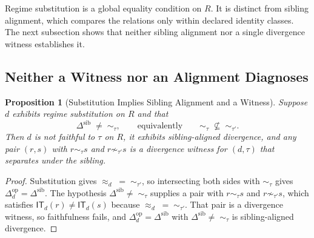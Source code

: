 \documentclass[11pt]{article}
\theoremstyle{plain}
\newtheorem{proposition}[theorem]{Proposition}
\theoremstyle{definition}
\theoremstyle{remark}
\newcommand{\IT}{\ensuremath{\mathsf{IT}}}
\newcommand{\Ker}{\ensuremath{\mathrel{\approx_{d}}}}
\newcommand{\Dop}{\ensuremath{\Delta^{\mathrm{op}}_{d}}}
\newcommand{\Dsib}{\ensuremath{\Delta^{\mathrm{sib}}}}
\begin{document}
Regime substitution is a global equality condition on \(R\).
It is distinct from sibling alignment, which compares the relations
only within declared identity classes.
The next subsection shows that neither sibling alignment
nor a single divergence witness establishes it.

\subsection{Neither a Witness nor an Alignment Diagnoses}

\begin{proposition}[Substitution Implies Sibling Alignment and a Witness]
  \label{oi.prop.substitution-witness}
  Suppose \(d\) exhibits regime substitution on \(R\)
  and that
  \[
    \Dsib
    \;\neq\;
    \sim_{\tau},
    \qquad\text{equivalently}\qquad
    \sim_{\tau}\;\not\subseteq\;\sim_{\tau'}.
  \]
  Then \(d\) is not faithful to \(\tau\) on \(R\),
  it exhibits sibling-aligned divergence,
  and any pair \((r,s)\) with \(r\sim_{\tau}s\) and \(r\not\sim_{\tau'}s\)
  is a divergence witness for \((d,\tau)\)
  that separates under the sibling.
\end{proposition}

\begin{proof}
  Substitution gives \(\Ker\;=\;\sim_{\tau'}\),
  so intersecting both sides with \(\sim_{\tau}\) gives \(\Dop=\Dsib\).
  The hypothesis \(\Dsib\neq\;\sim_{\tau}\)
  supplies a pair with \(r\sim_{\tau}s\) and \(r\not\sim_{\tau'}s\),
  which satisfies \(\IT_d(r)\neq\IT_d(s)\)
  because \(\Ker\;=\;\sim_{\tau'}\).
  That pair is a divergence witness,
  so faithfulness fails,
  and \(\Dop=\Dsib\) with \(\Dsib\neq\;\sim_{\tau}\)
  is sibling-aligned divergence.
\end{proof}
\end{document}
